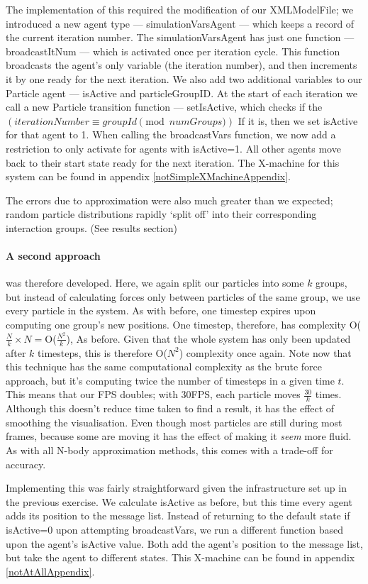 \documentclass[11pt,a4paper]{article}
\begin{document}
The implementation of this required the modification of our XMLModelFile; we introduced a new agent type --- simulationVarsAgent --- which keeps a record of the current iteration number. The simulationVarsAgent has just one function --- broadcastItNum --- which is activated once per iteration cycle. This function broadcasts the agent's only variable (the iteration number), and then increments it by one ready for the next iteration. We also add two additional variables to our Particle agent --- isActive and particleGroupID. At the start of each iteration we call a new Particle transition function --- setIsActive, which checks if the $(iterationNumber\equiv groupId \pmod{numGroups})$ If it is, then we set isActive for that agent to 1. When calling the broadcastVars function, we now add a restriction to only activate for agents with isActive=1. All other agents move back to their start state ready for the next iteration. The X-machine for this system can be found in appendix \ref{notSimpleXMachineAppendix}.

 The errors due to approximation were also much greater than we expected; random particle distributions rapidly `split off' into their corresponding interaction groups. (See results section)

\paragraph{A second approach} was therefore developed. Here, we again split our particles into some $k$ groups, but instead of calculating forces only between particles of the same group, we use every particle in the system. As with before, one timestep expires upon computing one group's new positions. One timestep, therefore, has complexity O($\frac{N}{k}\times N =$O($\frac{N^2}{k}$), As before. Given that the whole system has only been updated after $k$ timesteps, this is therefore O($N^2$) complexity once again. Note now that this technique has the same computational complexity as the brute force approach, but it's computing twice the number of timesteps in a given time $t$. This means that our FPS doubles; with 30FPS, each particle moves $\frac{30}{k}$ times. Although this doesn't reduce time taken to find a result, it has the effect of smoothing the visualisation. Even though most particles are still during most frames, because some are moving it has the effect of making it \emph{seem} more fluid. As with all N-body approximation methods, this comes with a trade-off for accuracy.

Implementing this was fairly straightforward given the infrastructure set up in the previous exercise. We calculate isActive as before, but this time every agent adds its position to the message list. Instead of returning to the default state if isActive=0 upon attempting broadcastVars, we run a different function based upon the agent's isActive value. Both add the agent's position to the message list, but take the agent to different states. This X-machine can be found in appendix \ref{notAtAllAppendix}.
\end{document}
